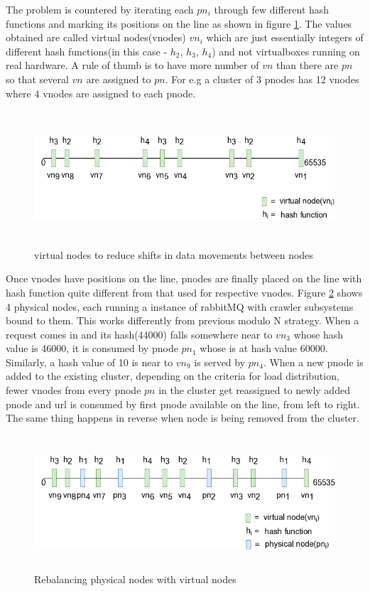\pagebreak

\noindent
The problem is countered by iterating each $pn_i$ through few different hash functions and marking its positions on the line as shown in figure \ref{fig:vnodesplit1}. The values obtained are called virtual nodes(vnodes) $vn_i$ which are just essentially integers of different hash functions(in this case - $h_2$, $h_3$, $h_4$) and not virtualboxes running on real hardware. A rule of thumb is to have more number of $vn$ than there are $pn$ so
that several $vn$ are assigned to $pn$. For e.g a cluster of 3 pnodes has 12 vnodes where 4 vnodes are assigned to each pnode.

\begin{figure}[h!]
  \centering
  \includegraphics[width=12cm,height=5cm,keepaspectratio]{../media/crawler/vnodesplit1.png}
  \caption{virtual nodes to reduce shifts in data movements between nodes}
  \label{fig:vnodesplit1}
\end{figure}

\noindent
Once vnodes have positions on the line, pnodes are finally placed on the line with hash function quite different from that used for respective vnodes. Figure \ref{fig:vnodesplit2} shows 4 physical nodes, each running
a instance of rabbitMQ with crawler subsystems bound to them. This works differently from previous modulo N strategy. When a request comes in and its hash(44000) falls somewhere near to $vn_3$ whose hash value is 46000, it is consumed by pnode $pn_1$ whose is at hash value 60000. Similarly, a hash value of 10 is near to $vn_9$ is served by $pn_4$. When a new pnode is added to the existing cluster, depending on the criteria for load distribution, fewer vnodes from every pnode $pn$ in the cluster get reassigned to newly added pnode and
url is consumed by first pnode available on the line, from left to right. The same thing happens in reverse when node is being removed from the cluster.

\begin{figure}[h!]
  \centering
  \includegraphics[width=12cm,height=5cm,keepaspectratio]{../media/crawler/vnodesplit2.png}
  \caption{Rebalancing physical nodes with virtual nodes}
  \label{fig:vnodesplit2}
\end{figure}

